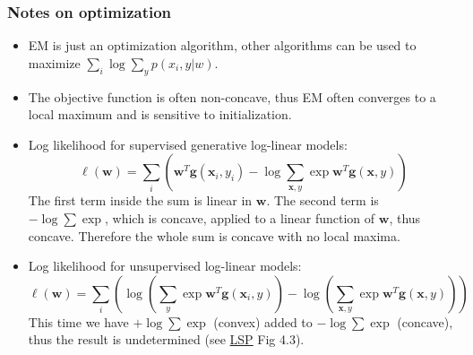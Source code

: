 \documentclass[ignorenonframetext,plain,fleqn]{beamer}
\renewcommand{\vec}{\mathbf}
\begin{document}
\begin{frame}\frametitle{Notes on optimization}
\begin{itemize}
\item EM is just an optimization algorithm, other algorithms can be
  used to maximize $\sum_i \log \sum_y p(x_i, y|w)$.
\item The objective function is often non-concave, thus EM often
  converges to a local maximum and is sensitive to initialization.
\item Log likelihood for supervised generative log-linear models:
\[
\ell(\vec{w}) = \sum_i (\vec{w}^T \vec{g}(\vec{x}_i,y_i) - \log \sum_{\vec{x},y}
    \exp \vec{w}^T \vec{g}(\vec{x}, y))
\]
The first term inside the sum is linear in $\vec{w}$.  The second term
is $-\log\sum\exp$, which is concave, applied to a linear function of
$\vec{w}$, thus concave.  Therefore the whole sum is concave with no
local maxima.
\item Log likelihood for unsupervised log-linear models: \[
  \ell(\vec{w}) = \sum_i (\log (\sum_y \exp \vec{w}^T
  \vec{g}(\vec{x}_i,y)) - \log (\sum_{\vec{x},y} \exp \vec{w}^T
  \vec{g}(\vec{x}, y)))
\]
This time we have $+\log\sum\exp$ (convex) added to $-\log\sum\exp$
(concave), thus the result is undetermined (see 
\href{http://www.morganclaypool.com/doi/abs/10.2200/S00361ED1V01Y201105HLT013}{LSP}
Fig 4.3).
\end{itemize}
\end{frame}

\end{document}
